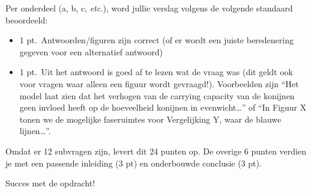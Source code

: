 \documentclass[
  letterpaper,
  DIV=11,
  numbers=noendperiod]{scrartcl}
\providecommand{\tightlist}{%
  \setlength{\itemsep}{0pt}\setlength{\parskip}{0pt}}
\begin{document}
Per onderdeel (a, b, c, \emph{etc.}), word jullie verslag volgens de
volgende standaard beoordeeld:

\begin{itemize}
\tightlist
\item
  1 pt.~Antwoorden/figuren zijn correct (of er wordt een juiste
  beredenering gegeven voor een alternatief antwoord)
\item
  1 pt.~Uit het antwoord is goed af te lezen wat de vraag was (dit geldt
  ook voor vragen waar alleen een figuur wordt gevraagd!). Voorbeelden
  zijn ``Het model laat zien dat het verhogen van de carrying capacity
  van de konijnen geen invloed heeft op de hoeveelheid konijnen in
  evenwicht\ldots{}'' of ``In Figuur X tonen we de mogelijke faseruimtes
  voor Vergelijking Y, waar de blauwe lijnen\ldots{}''.
\end{itemize}

Omdat er 12 subvragen zijn, levert dit 24 punten op. De overige 6 punten
verdien je met een passende inleiding (3 pt) en onderbouwde conclusie (3
pt).

Succes met de opdracht!
\end{document}
